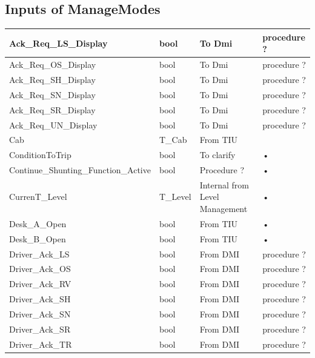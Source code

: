 \subsection{Inputs of ManageModes}


\begin{center}

\begin{supertabular}{| m{6cm} | m{3cm} | m{3cm} | m{3cm} |}
\hline 
Ack\_Req\_LS\_Display  & bool & To Dmi & procedure ?  \\ 
\hline 
Ack\_Req\_OS\_Display  & bool & To Dmi & procedure ?  \\ 
\hline  
Ack\_Req\_SH\_Display  & bool & To Dmi & procedure ?  \\ 
\hline 
Ack\_Req\_SN\_Display & bool & To Dmi & procedure ?  \\ 
\hline 
Ack\_Req\_SR\_Display & bool & To Dmi & procedure ?  \\ 
\hline 
Ack\_Req\_UN\_Display & bool & To Dmi & procedure ?  \\ 
\hline 
Cab &	T\_Cab	& From TIU &  \\ 
\hline 
ConditionToTrip & bool & To clarify& • \\ 
\hline 
Continue\_Shunting\_Function\_Active & bool &  Procedure ?& • \\ 
\hline 
CurrenT\_Level	& T\_Level	& Internal from Level Management& • \\ 
\hline 
Desk\_A\_Open & bool & From TIU & • \\ 
\hline 
Desk\_B\_Open & bool & From TIU & • \\ 
\hline 
Driver\_Ack\_LS & bool & From DMI & procedure ?  \\ 
\hline 
Driver\_Ack\_OS & bool & From DMI & procedure ?  \\ 
\hline 
Driver\_Ack\_RV & bool & From DMI & procedure ?  \\ 
\hline 
Driver\_Ack\_SH & bool & From DMI & procedure ?  \\ 
\hline 
Driver\_Ack\_SN & bool & From DMI & procedure ?  \\ 
\hline 
Driver\_Ack\_SR & bool & From DMI & procedure ?  \\ 
\hline 
Driver\_Ack\_TR & bool & From DMI & procedure ?  \\ 

\end{supertabular}
\end{center}
